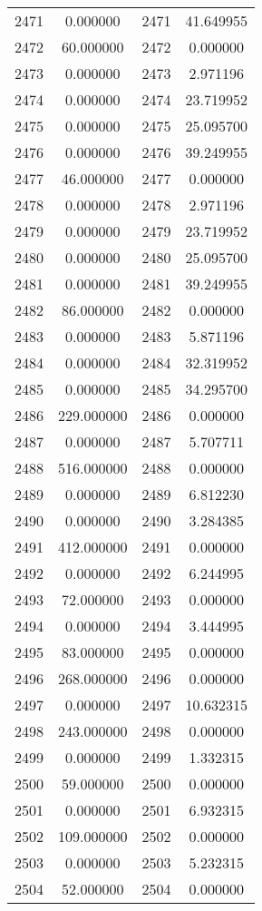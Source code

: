 \documentclass[12pt]{article}
\begin{document}
\begin{longtable}{@{}cccc@{}}
2471 & 0.000000 & 2471 & 41.649955 \\
2472 & 60.000000 & 2472 & 0.000000 \\
2473 & 0.000000 & 2473 & 2.971196 \\
2474 & 0.000000 & 2474 & 23.719952 \\
2475 & 0.000000 & 2475 & 25.095700 \\
2476 & 0.000000 & 2476 & 39.249955 \\
2477 & 46.000000 & 2477 & 0.000000 \\
2478 & 0.000000 & 2478 & 2.971196 \\
2479 & 0.000000 & 2479 & 23.719952 \\
2480 & 0.000000 & 2480 & 25.095700 \\
2481 & 0.000000 & 2481 & 39.249955 \\
2482 & 86.000000 & 2482 & 0.000000 \\
2483 & 0.000000 & 2483 & 5.871196 \\
2484 & 0.000000 & 2484 & 32.319952 \\
2485 & 0.000000 & 2485 & 34.295700 \\
2486 & 229.000000 & 2486 & 0.000000 \\
2487 & 0.000000 & 2487 & 5.707711 \\
2488 & 516.000000 & 2488 & 0.000000 \\
2489 & 0.000000 & 2489 & 6.812230 \\
2490 & 0.000000 & 2490 & 3.284385 \\
2491 & 412.000000 & 2491 & 0.000000 \\
2492 & 0.000000 & 2492 & 6.244995 \\
2493 & 72.000000 & 2493 & 0.000000 \\
2494 & 0.000000 & 2494 & 3.444995 \\
2495 & 83.000000 & 2495 & 0.000000 \\
2496 & 268.000000 & 2496 & 0.000000 \\
2497 & 0.000000 & 2497 & 10.632315 \\
2498 & 243.000000 & 2498 & 0.000000 \\
2499 & 0.000000 & 2499 & 1.332315 \\
2500 & 59.000000 & 2500 & 0.000000 \\
2501 & 0.000000 & 2501 & 6.932315 \\
2502 & 109.000000 & 2502 & 0.000000 \\
2503 & 0.000000 & 2503 & 5.232315 \\
2504 & 52.000000 & 2504 & 0.000000 \\

\end{longtable}
\end{document}

